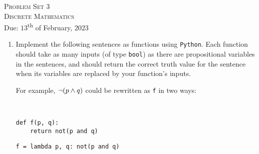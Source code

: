 




\begin{center}
    \textsc{\huge Problem Set 3}\\
    \textsc{Discrete Mathematics}\\
    {\color{gruvred}Due: $13$\textsuperscript{th} of February, $2023$}
\end{center}

\begin{enumerate}
    \item
        Implement the following sentences as functions using \texttt{Python}.
        Each function should take as many inputs (of type \texttt{bool})
        as there are propositional variables in the sentences,
        and should return the correct truth value for the sentence
        when its variables are replaced by your function's inputs.

        \begin{center}
            \begin{minipage}{.3\linewidth}
                For example,
                \(\neg \pn*{p \meet q}\) could be rewritten as \texttt{f} in two ways:
            \end{minipage}%
            \begin{minipage}{.05\linewidth}
                ~
            \end{minipage}%
            \begin{minipage}{.3\linewidth}
\begin{verbatim}def f(p, q):
    return not(p and q)\end{verbatim}
            \end{minipage}%
            \begin{minipage}{.3\linewidth}
\begin{verbatim}f = lambda p, q: not(p and q)\end{verbatim}
            \end{minipage}
        \end{center}


\end{enumerate}
